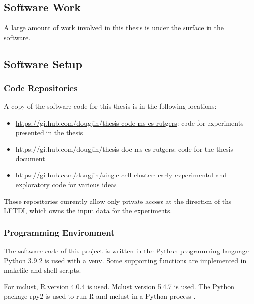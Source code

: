 \begin{theappendices}
\chapter{Software Work}
\thispagestyle{myheadings}
\label{appendix:appendix:Software Work}

A large amount of work involved in this thesis is under the surface in the software.

\section{Software Setup}

\FloatBarrier
\subsection{Code Repositories}

A copy of the software code for this thesis is in the following locations:

\begin{itemize}
  \item \url{https://github.com/dougjih/thesis-code-ms-cs-rutgers}: code for experiments presented in the thesis
  \item \url{https://github.com/dougjih/thesis-doc-ms-cs-rutgers}: code for the thesis document
  \item \url{https://github.com/dougjih/single-cell-cluster}: early experimental and exploratory code for various ideas
\end{itemize}

These repositories currently allow only private access at the direction of the LFTDI, which owns the input data for the experiments.

\FloatBarrier
\subsection{Programming Environment}

The software code of this project is written in the Python programming language. Python 3.9.2 is used with a venv. Some supporting functions are implemented in makefile and shell scripts.

For mclust, R version 4.0.4 is used. Mclust version 5.4.7 is used. The Python package rpy2 is used to run R and mclust in a Python process \cite{noauthor_rpy2_nodate}.


\end{theappendices}
